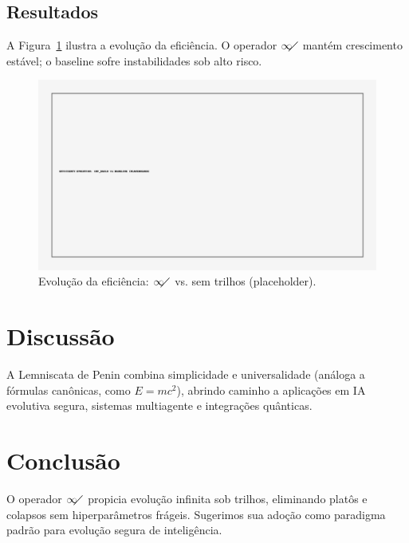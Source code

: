 \documentclass[11pt]{article}
\begin{document}
\subsection{Resultados}
A Figura~\ref{fig:efficiency} ilustra a evolução da eficiência. O operador $\infty\!\!\diagup$ mantém
crescimento estável; o baseline sofre instabilidades sob alto risco.
\begin{figure}[h]
  \centering
  \includegraphics[width=0.85\linewidth]{figures/efficiency_placeholder.png}
  \caption{Evolução da eficiência: $\infty\!\!\diagup$ vs. sem trilhos (placeholder).}
  \label{fig:efficiency}
\end{figure}

\section{Discussão}
A Lemniscata de Penin combina simplicidade e universalidade (análoga a fórmulas canônicas, como $E=mc^2$),
abrindo caminho a aplicações em IA evolutiva segura, sistemas multiagente e integrações quânticas.

\section{Conclusão}
O operador $\infty\!\!\diagup$ propicia evolução infinita sob trilhos, eliminando platôs e colapsos sem
hiperparâmetros frágeis. Sugerimos sua adoção como paradigma padrão para evolução segura de inteligência.



\end{document}
